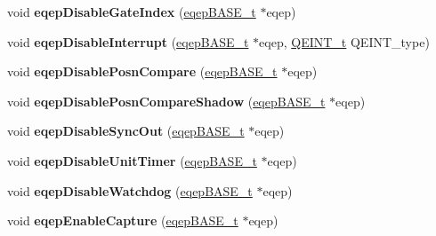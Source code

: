 \begin{DoxyCompactItemize}
void {\bfseries eqep\+Disable\+Gate\+Index} (\mbox{\hyperlink{reg__eqep_8h_a794db63555812863c39c5d214fd4f215}{eqep\+B\+A\+S\+E\+\_\+t}} $\ast$eqep)
\item 
\mbox{\label{group__eQEP_ga44f680dc8f0e13630baf59a593840b36}} 
void {\bfseries eqep\+Disable\+Interrupt} (\mbox{\hyperlink{reg__eqep_8h_a794db63555812863c39c5d214fd4f215}{eqep\+B\+A\+S\+E\+\_\+t}} $\ast$eqep, \mbox{\hyperlink{eqep_8h_af85f2f99be537503acd2fddf67e63caf}{Q\+E\+I\+N\+T\+\_\+t}} Q\+E\+I\+N\+T\+\_\+type)
\item 
\mbox{\label{group__eQEP_gaee9ecc7249f893fb8fe837763330c0b2}} 
void {\bfseries eqep\+Disable\+Posn\+Compare} (\mbox{\hyperlink{reg__eqep_8h_a794db63555812863c39c5d214fd4f215}{eqep\+B\+A\+S\+E\+\_\+t}} $\ast$eqep)
\item 
\mbox{\label{group__eQEP_ga4e6e844ae77c411d24727669db0fd7dc}} 
void {\bfseries eqep\+Disable\+Posn\+Compare\+Shadow} (\mbox{\hyperlink{reg__eqep_8h_a794db63555812863c39c5d214fd4f215}{eqep\+B\+A\+S\+E\+\_\+t}} $\ast$eqep)
\item 
\mbox{\label{group__eQEP_gaf8b3f9623d0e06b7daa5e0e1fcc07a57}} 
void {\bfseries eqep\+Disable\+Sync\+Out} (\mbox{\hyperlink{reg__eqep_8h_a794db63555812863c39c5d214fd4f215}{eqep\+B\+A\+S\+E\+\_\+t}} $\ast$eqep)
\item 
\mbox{\label{group__eQEP_ga4e0bcee3c11c14b986c7638d4a765ac3}} 
void {\bfseries eqep\+Disable\+Unit\+Timer} (\mbox{\hyperlink{reg__eqep_8h_a794db63555812863c39c5d214fd4f215}{eqep\+B\+A\+S\+E\+\_\+t}} $\ast$eqep)
\item 
\mbox{\label{group__eQEP_gaf869dd9f53340fb208bf0fdc1b1688de}} 
void {\bfseries eqep\+Disable\+Watchdog} (\mbox{\hyperlink{reg__eqep_8h_a794db63555812863c39c5d214fd4f215}{eqep\+B\+A\+S\+E\+\_\+t}} $\ast$eqep)
\item 
\mbox{\label{group__eQEP_gac8499f2a942a720c39610cb59066d341}} 
void {\bfseries eqep\+Enable\+Capture} (\mbox{\hyperlink{reg__eqep_8h_a794db63555812863c39c5d214fd4f215}{eqep\+B\+A\+S\+E\+\_\+t}} $\ast$eqep)
\item 
\mbox{\label{group__eQEP_gae3a8d58d369cffcd229a356db68e05fa}} 

\end{DoxyCompactItemize}
